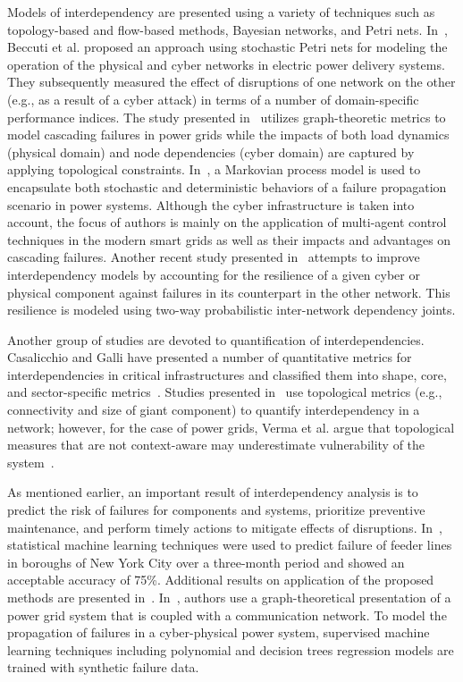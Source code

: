 \documentclass[12pt]{elsarticle}
\begin{document}
Models of interdependency are presented using a variety of techniques such as topology-based and flow-based methods, Bayesian networks, and Petri nets. In~\cite{BeC12}, Beccuti et al. proposed an approach using stochastic Petri nets for modeling the operation of the physical and cyber networks in electric power delivery systems. They subsequently measured the effect of disruptions of one network on the other (e.g., as a result of a cyber attack) in terms of a number of domain-specific performance indices. The study presented in~\cite{ZhH18} utilizes graph-theoretic metrics to model cascading failures in power grids while the impacts of both load dynamics (physical domain) and node dependencies (cyber domain) are captured by applying topological constraints. In~\cite{GuY19}, a Markovian process model is used to encapsulate both stochastic and deterministic behaviors of a failure propagation scenario in power systems. Although the cyber infrastructure is taken into account, the focus of authors is mainly on the application of multi-agent control techniques in the modern smart grids as well as their impacts and advantages on cascading failures. Another recent study presented in~\cite{TuX19} attempts to improve interdependency models by accounting for the resilience of a given cyber or physical component against failures in its counterpart in the other network. This resilience is modeled using two-way probabilistic inter-network dependency joints.

Another group of studies are devoted to quantification of interdependencies. Casalicchio and Galli have presented a number of quantitative metrics for interdependencies in critical infrastructures and classified them into shape, core, and sector-specific metrics~\cite{CaG08}. Studies presented in~\cite{HuW15a,ZhG13} use topological metrics (e.g., connectivity and size of giant component) to quantify interdependency in a network; however, for the case of power grids, Verma et al. argue that topological measures that are not context-aware may underestimate vulnerability of the system~\cite{VeE15}.

As mentioned earlier, an important result of interdependency analysis is to predict the risk of failures for components and systems, prioritize preventive maintenance, and perform timely actions to mitigate effects of disruptions. In~\cite{GrB06}, statistical machine learning techniques were used to predict failure of feeder lines in boroughs of New York City over a three-month period and showed an acceptable accuracy of 75\%. Additional results on application of the proposed methods are presented in~\cite{RuW12}. In~\cite{StS20}, authors use a graph-theoretical presentation of a power grid system that is coupled with a communication network. To model the propagation of failures in a cyber-physical power system, supervised machine learning techniques including polynomial and decision trees regression models are trained with synthetic failure data.
\end{document}
